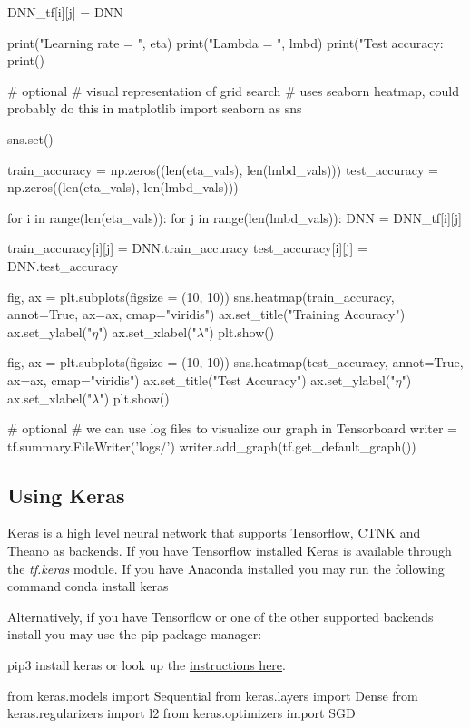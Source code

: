 \documentclass[%
oneside,                 %
final,                   %
10pt]{article}
\begin{document}
        DNN_tf[i][j] = DNN
        
        print("Learning rate = ", eta)
        print("Lambda = ", lmbd)
        print("Test accuracy: %
        print()
\epycod

\bpycod
# optional
# visual representation of grid search
# uses seaborn heatmap, could probably do this in matplotlib
import seaborn as sns

sns.set()

train_accuracy = np.zeros((len(eta_vals), len(lmbd_vals)))
test_accuracy = np.zeros((len(eta_vals), len(lmbd_vals)))

for i in range(len(eta_vals)):
    for j in range(len(lmbd_vals)):
        DNN = DNN_tf[i][j]

        train_accuracy[i][j] = DNN.train_accuracy
        test_accuracy[i][j] = DNN.test_accuracy

        
fig, ax = plt.subplots(figsize = (10, 10))
sns.heatmap(train_accuracy, annot=True, ax=ax, cmap="viridis")
ax.set_title("Training Accuracy")
ax.set_ylabel("$\eta$")
ax.set_xlabel("$\lambda$")
plt.show()

fig, ax = plt.subplots(figsize = (10, 10))
sns.heatmap(test_accuracy, annot=True, ax=ax, cmap="viridis")
ax.set_title("Test Accuracy")
ax.set_ylabel("$\eta$")
ax.set_xlabel("$\lambda$")
plt.show()
\epycod

\bpycod
# optional
# we can use log files to visualize our graph in Tensorboard
writer = tf.summary.FileWriter('logs/')
writer.add_graph(tf.get_default_graph())
\epycod


\subsection{Using Keras}

Keras is a high level \href{{https://en.wikipedia.org/wiki/Application_programming_interface}}{neural network}
that supports Tensorflow, CTNK and Theano as backends.  
If you have Tensorflow installed Keras is available through the \emph{tf.keras} module.  
If you have Anaconda installed you may run the following command
\bpycod
conda install keras
\epycod

Alternatively, if you have Tensorflow or one of the other supported backends install you may use the pip package manager: 

\bpycod
pip3 install keras
\epycod
or look up the \href{{https://keras.io/}}{instructions here}.

\bpycod
from keras.models import Sequential
from keras.layers import Dense
from keras.regularizers import l2
from keras.optimizers import SGD
\end{document}
